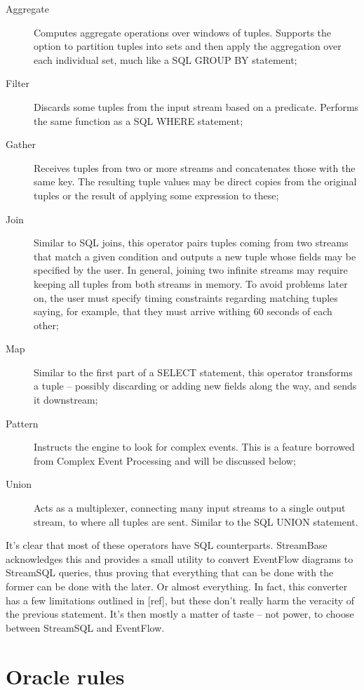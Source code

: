 \documentclass{report}
\begin{document}
\begin{description}
\item [Aggregate] Computes aggregate operations over windows of tuples. Supports the option to partition tuples into sets and then apply the aggregation over each individual set, much like a SQL GROUP BY statement;
\item [Filter] Discards some tuples from the input stream based on a predicate. Performs the same function as a SQL WHERE statement;
\item [Gather] Receives tuples from two or more streams and concatenates those with the same key. The resulting tuple values may be direct copies from the original tuples or the result of applying some expression to these;
\item [Join] Similar to SQL joins, this operator pairs tuples coming from two streams that match a given condition and outputs a new tuple whose fields may be specified by the user. In general, joining two infinite streams may require keeping all tuples from both streams in memory. To avoid problems later on, the user must specify timing constraints regarding matching tuples saying, for example, that they must arrive withing 60 seconds of each other;
\item [Map] Similar to the first part of a SELECT statement, this operator transforms a tuple -- possibly discarding or adding new fields along the way, and sends it downstream;
\item [Pattern] Instructs the engine to look for complex events. This is a feature borrowed from Complex Event Processing and will be discussed below;
\item [Union] Acts as a multiplexer, connecting many input streams to a single output stream, to where all tuples are sent. Similar to the SQL UNION statement.
\end{description}

It's clear that most of these operators have SQL counterparts. StreamBase acknowledges this and provides a small utility to convert EventFlow diagrams to StreamSQL queries, thus proving that everything that can be done with the former can be done with the later. Or almost everything. In fact, this converter has a few limitations outlined in [ref], but these don't really harm the veracity of the previous statement. It's then mostly a matter of taste -- not power, to choose between StreamSQL and EventFlow.

\section{Oracle rules}
\end{document}
